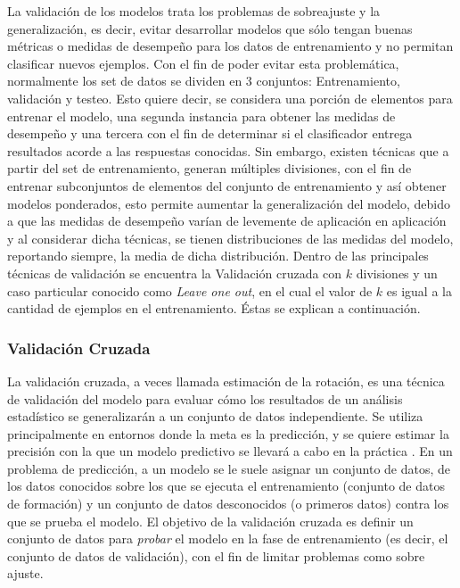 La validación de los modelos trata los problemas de sobreajuste y la generalización, es decir, evitar desarrollar modelos que sólo tengan buenas métricas o medidas de desempeño para los datos de entrenamiento y no permitan clasificar nuevos ejemplos. Con el fin de poder evitar esta problemática, normalmente los set de datos se dividen en 3 conjuntos: Entrenamiento, validación y testeo. Esto quiere decir, se considera una porción de elementos para entrenar el modelo, una segunda instancia para obtener las medidas de desempeño y una tercera con el fin de determinar si el clasificador entrega resultados acorde a las respuestas conocidas. Sin embargo, existen técnicas que a partir del set de entrenamiento, generan múltiples divisiones, con el fin de entrenar subconjuntos de elementos del conjunto de entrenamiento y así obtener modelos ponderados, esto permite aumentar la generalización del modelo, debido a que las medidas de desempeño varían de levemente de aplicación en aplicación y al considerar dicha técnicas, se tienen distribuciones de las medidas del modelo, reportando siempre, la media de dicha distribución. Dentro de las principales técnicas de validación se encuentra la Validación cruzada con $k$ divisiones y un caso particular conocido como \textit{Leave one out}, en el cual el valor de $k$ es igual a la cantidad de ejemplos en el entrenamiento. Éstas se explican a continuación.

\subsubsection{Validación Cruzada}

La validación cruzada, a veces llamada estimación de la rotación, es una técnica de validación del
modelo para evaluar cómo los resultados de un análisis estadístico se generalizarán a un conjunto de datos independiente. Se utiliza principalmente en entornos donde la meta es la predicción, y se
quiere estimar la precisión con la que un modelo predictivo se llevará a cabo en la práctica \cite{crossval}. En un
problema de predicción, a un modelo se le suele asignar un conjunto de datos, de los datos conocidos sobre los que se ejecuta el entrenamiento (conjunto de datos de formación) y un conjunto de datos desconocidos (o primeros datos) contra los que se prueba el modelo. El objetivo de la validación cruzada es definir un conjunto de datos para \textit{probar} el modelo en la fase de entrenamiento (es decir, el conjunto de datos de validación), con el fin de limitar problemas como sobre ajuste.

